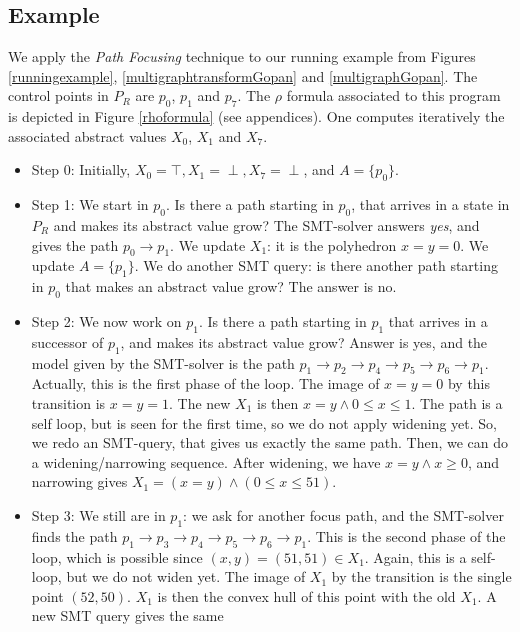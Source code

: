 \documentclass[a4paper,english,titlepage,11pt]{report}
\begin{document}
	\subsection{Example}

	We apply the \emph{Path Focusing} technique to our running example from
	Figures \ref{runningexample}, \ref{multigraphtransformGopan} and
	\ref{multigraphGopan}.
	The control points in $P_R$ are $p_0$, $p_1$ and $p_7$. 
	The $\rho$ formula associated to this program is depicted in
	Figure \ref{rhoformula} (see appendices).
	One computes
	iteratively the associated abstract values $X_0$, $X_1$ and $X_7$.

\begin{itemize}
\item Step 0: Initially, $X_0 = \top, X_1 = \perp, X_7 = \perp$, and $A =
\{p_0\}$.
\item Step 1: We start in $p_0$. Is there a path starting in $p_0$, that arrives
in a state in $P_R$ and makes its abstract value grow? The SMT-solver answers
\emph{yes}, and gives the path $p_0 \rightarrow p_1$. We update $X_1$:
it is the polyhedron $x=y=0$. We update $A = \{p_1\}$. 
We do another SMT query: is there another path
starting in $p_0$ that makes an abstract value grow? The answer is no.
\item Step 2: We now work on $p_1$. Is there a path starting in $p_1$ that
arrives in a successor of $p_1$, and makes its abstract value grow? Answer is
yes, and the model given by the SMT-solver is the path $p_1 \rightarrow p_2
\rightarrow p_4 \rightarrow p_5 \rightarrow p_6 \rightarrow p_1$. Actually, this
is the first phase of the loop. 
The image of $x=y=0$ by this transition is $x=y=1$. The new $X_1$ is then $x=y
\wedge 0\leq x \leq 1$. The path is a self loop, but is seen for the first time,
so we do not apply widening yet. So, we redo an SMT-query, that gives us exactly
the same path. Then, we can do a widening/narrowing sequence. 
After widening, we have $x=y \wedge x \geq 0$, and narrowing gives $X_1 = (x=y)
\wedge (0 \leq x \leq 51)$.
\item Step 3: We still are in $p_1$: we ask for another focus path, and the
SMT-solver finds the path $p_1 \rightarrow p_3
\rightarrow p_4 \rightarrow p_5 \rightarrow p_6 \rightarrow p_1$. This is the
second phase of the loop, which is possible since $(x,y)=(51,51) \in X_1$.
Again, this is a self-loop, but we do not widen yet. The
image of $X_1$ by the transition is the single point $(52,50)$. $X_1$ is then
the convex hull of this point with the old $X_1$. A new SMT query gives the same

\end{itemize}
\end{document}
